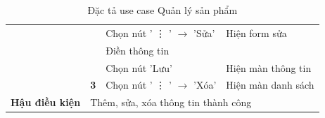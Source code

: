 \documentclass[../DoAn.tex]{subfiles}
\begin{document}
\begin{table}[H]
\begin{tabular}{|l|c|l|l|}
                                                &                                                              & Chọn nút ' \vdots{} ' $\rightarrow$ 'Sửa' & Hiện form sửa                                   \\ \cline{3-4}
                                                &                                                              & Điền thông tin                            &                                                 \\
                                                &                                                              & Chọn nút 'Lưu'                            & Hiện màn thông tin                              \\ \cline{2-4}
                                                & \multirow{1}{*}{\textbf{3}}                                  & Chọn nút ' \vdots{} ' $\rightarrow$ 'Xóa' & Hiện màn danh sách                              \\ \hline
        \textbf{Hậu điều kiện}                  & \multicolumn{3}{l|}{Thêm, sửa, xóa thông tin thành công}                                                                                                   \\ \hline
    \end{tabular}
    \caption{Đặc tả use case Quản lý sản phẩm}
    \label{table:uc-product-manage}
\end{table}
\end{document}
